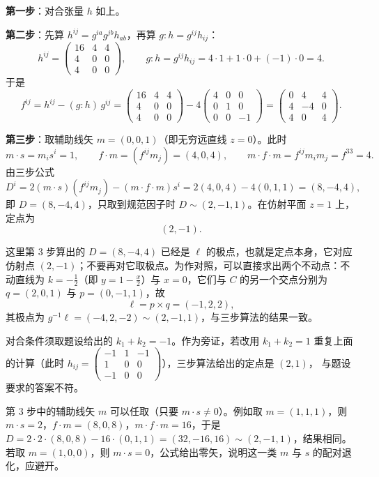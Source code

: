 \textbf{第一步}：对合张量 $h$ 如上。

\textbf{第二步}：先算 $h^{ij}=g^{ia}g^{jb}h_{ab}$，再算 $g:h=g^{ij}h_{ij}$：
\[
h^{ij}=
\begin{pmatrix}
16 & 4 & 4\\
4 & 0 & 0\\
4 & 0 & 0
\end{pmatrix},
\qquad
g:h=g^{ij}h_{ij}=4\cdot1+1\cdot0+(-1)\cdot0=4 .
\]
于是
\[
f^{ij}=h^{ij}-(g:h)\,g^{ij}
=
\begin{pmatrix}
16 & 4 & 4\\
4 & 0 & 0\\
4 & 0 & 0
\end{pmatrix}
-4
\begin{pmatrix}
4 & 0 & 0\\
0 & 1 & 0\\
0 & 0 & -1
\end{pmatrix}
=
\begin{pmatrix}
0 & 4 & 4\\
4 & -4 & 0\\
4 & 0 & 4
\end{pmatrix}.
\]

\textbf{第三步}：取辅助线矢 $m=(0,0,1)$（即无穷远直线 $z=0$）。此时
\[
m\cdot s=m_is^i=1,\qquad
f\cdot m=(f^{ij}m_j)=(4,0,4),\qquad
m\cdot f\cdot m=f^{ij}m_im_j=f^{33}=4 .
\]
由三步公式
\[
D^i=2(m\cdot s)(f^{ij}m_j)-(m\cdot f\cdot m)s^i
=2(4,0,4)-4(0,1,1)=(8,-4,4),
\]
即 $D=(8,-4,4)$，只取到规范因子时 $D\sim(2,-1,1)$。在仿射平面 $z=1$ 上，定点为
\[
\boxed{(2,-1)} .
\]

\begin{remark}
这里第 3 步算出的 $D=(8,-4,4)$ 已经是 $\ell$ 的极点，也就是定点本身，它对应仿射点
$(2,-1)$；不要再对它取极点。为作对照，可以直接求出两个不动点：不动直线为
$k=-\tfrac12$（即 $y=1-\tfrac x2$）与 $x=0$，它们与 $C$ 的另一个交点分别为 $q=(2,0,1)$
与 $p=(0,-1,1)$，故
\[
\ell=p\times q=(-1,2,2),
\]
其极点为 $g^{-1}\ell=(-4,2,-2)\sim(2,-1,1)$，与三步算法的结果一致。
\end{remark}

\begin{remark}
对合条件须取题设给出的 $k_1+k_2=-1$。作为旁证，若改用 $k_1+k_2=1$ 重复上面的计算（此时
$h_{ij}=\begin{pmatrix}-1&1&-1\\1&0&0\\-1&0&0\end{pmatrix}$），三步算法给出的定点是 $(2,1)$，
与题设要求的答案不符。
\end{remark}

\begin{remark}
第 3 步中的辅助线矢 $m$ 可以任取（只要 $m\cdot s\neq0$）。例如取 $m=(1,1,1)$，则
$m\cdot s=2$，$f\cdot m=(8,0,8)$，$m\cdot f\cdot m=16$，于是
$D=2\cdot2\cdot(8,0,8)-16\cdot(0,1,1)=(32,-16,16)\sim(2,-1,1)$，结果相同。若取
$m=(1,0,0)$，则 $m\cdot s=0$，公式给出零矢，说明这一类 $m$ 与 $s$ 的配对退化，应避开。
\end{remark}
